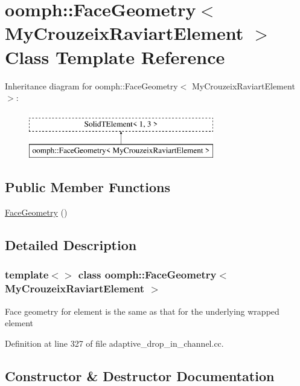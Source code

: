 \hypertarget{classoomph_1_1FaceGeometry_3_01MyCrouzeixRaviartElement_01_4}{}\section{oomph\+:\+:Face\+Geometry$<$ My\+Crouzeix\+Raviart\+Element $>$ Class Template Reference}
\label{classoomph_1_1FaceGeometry_3_01MyCrouzeixRaviartElement_01_4}
Inheritance diagram for oomph\+:\+:Face\+Geometry$<$ My\+Crouzeix\+Raviart\+Element $>$\+:\begin{figure}[H]
\begin{center}
\leavevmode
\includegraphics[height=2.000000cm]{classoomph_1_1FaceGeometry_3_01MyCrouzeixRaviartElement_01_4}
\end{center}
\end{figure}
\subsection*{Public Member Functions}
\begin{DoxyCompactItemize}
\item 
\hyperlink{classoomph_1_1FaceGeometry_3_01MyCrouzeixRaviartElement_01_4_a28b4b942614e6cfee40e773deb3e3003}{Face\+Geometry} ()
\end{DoxyCompactItemize}


\subsection{Detailed Description}
\subsubsection*{template$<$$>$\newline
class oomph\+::\+Face\+Geometry$<$ My\+Crouzeix\+Raviart\+Element $>$}

Face geometry for element is the same as that for the underlying wrapped element 

Definition at line 327 of file adaptive\+\_\+drop\+\_\+in\+\_\+channel.\+cc.



\subsection{Constructor \& Destructor Documentation}
\mbox{\label{classoomph_1_1FaceGeometry_3_01MyCrouzeixRaviartElement_01_4_a28b4b942614e6cfee40e773deb3e3003}} 
